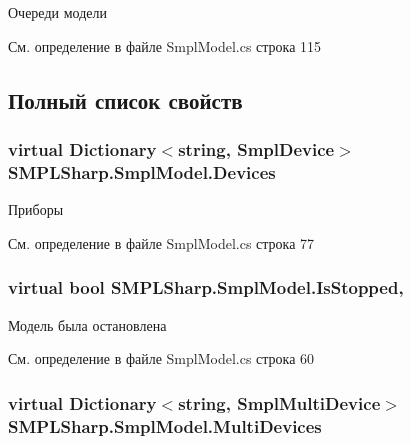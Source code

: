 Очереди модели 



См. определение в файле Smpl\-Model.\-cs строка 115



\subsection{Полный список свойств}
\hypertarget{class_s_m_p_l_sharp_1_1_smpl_model_af79bc37f93c34d07abbdf36028581640}{
\subsubsection[{Devices}]{\setlength{\rightskip}{0pt plus 5cm}virtual Dictionary$<$string, {\bf Smpl\-Device}$>$ S\-M\-P\-L\-Sharp.\-Smpl\-Model.\-Devices\hspace{0.3cm}{\ttfamily [get]}}}\label{df/d34/class_s_m_p_l_sharp_1_1_smpl_model_af79bc37f93c34d07abbdf36028581640}


Приборы 



См. определение в файле Smpl\-Model.\-cs строка 77

\hypertarget{class_s_m_p_l_sharp_1_1_smpl_model_a5427e31d8b72ff5823518e5eff801fd3}{
\subsubsection[{Is\-Stopped}]{\setlength{\rightskip}{0pt plus 5cm}virtual bool S\-M\-P\-L\-Sharp.\-Smpl\-Model.\-Is\-Stopped\hspace{0.3cm}{\ttfamily [get]}, {\ttfamily [set]}}}\label{df/d34/class_s_m_p_l_sharp_1_1_smpl_model_a5427e31d8b72ff5823518e5eff801fd3}


Модель была остановлена 



См. определение в файле Smpl\-Model.\-cs строка 60

\hypertarget{class_s_m_p_l_sharp_1_1_smpl_model_a6a37ccf8af439fc11b156eff04514e2e}{
\subsubsection[{Multi\-Devices}]{\setlength{\rightskip}{0pt plus 5cm}virtual Dictionary$<$string, {\bf Smpl\-Multi\-Device}$>$ S\-M\-P\-L\-Sharp.\-Smpl\-Model.\-Multi\-Devices\hspace{0.3cm}{\ttfamily [get]}}}\label{df/d34/class_s_m_p_l_sharp_1_1_smpl_model_a6a37ccf8af439fc11b156eff04514e2e}


